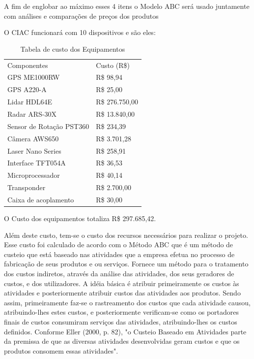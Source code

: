 A fim de englobar ao máximo esses 4 itens o Modelo ABC será usado juntamente com análises e comparações de preços dos produtos
 
O CIAC funcionará com 10 dispositivos e são eles:

\begin{table}[]
\centering
\caption{Tabela de custo dos Equipamentos}
\label{custo_equip}
\begin{tabular}{ll}
	Componentes & Custo (R\$) \\ 
	GPS ME1000RW & R\$ 98,94\\
	GPS A220-A & R\$ 25,00\\
	Lidar HDL64E & R\$ 276.750,00\\
	Radar ARS-30X & R\$ 13.840,00\\
	Sensor de Rotação PST360 & R\$ 234,39\\
	Câmera AWS650 & R\$ 3.701,28\\
	Laser Nano Series & R\$ 258,91\\
	Interface TFT054A & R\$ 36,53\\
	Microprocessador & R\$ 40,14\\
	Transponder & R\$ 2.700,00\\
	Caixa de acoplamento & R\$ 30,00
\end{tabular}
\end{table}

O Custo dos equipamentos totaliza R\$ 297.685,42.

Além deste custo, tem-se o custo dos recursos necessários para realizar o projeto. Esse custo foi calculado de acordo com o Método ABC que é um método de custeio que está baseado nas atividades que a empresa efetua no processo de fabricação de seus produtos e ou serviços. Fornece um método para o tratamento dos custos indiretos, através da análise das atividades, dos seus geradores de custos, e dos utilizadores. A idéia básica é atribuir primeiramente os custos às atividades e posteriormente atribuir custos das atividades aos produtos. Sendo assim, primeiramente faz-se o rastreamento dos custos que cada atividade causou, atribuindo-lhes estes custos, e posteriormente verificam-se como os portadores finais de custos consumiram serviços das atividades, atribuindo-lhes os custos definidos. Conforme Eller (2000, p. 82), "o Custeio Baseado em Atividades parte da premissa de que as diversas atividades desenvolvidas geram custos e que os produtos consomem essas atividades".  

